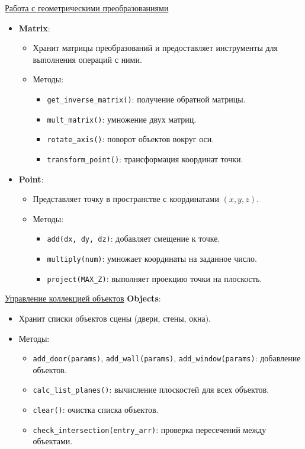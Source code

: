 \underline{Работа с геометрическими преобразованиями}
\begin{itemize}
    \item \textbf{Matrix}:
    \begin{itemize}
        \item Хранит матрицы преобразований и предоставляет инструменты для выполнения операций с ними.
        \item Методы:
        \begin{itemize}
            \item \verb|get_inverse_matrix()|: получение обратной матрицы.
            \item \verb|mult_matrix()|: умножение двух матриц.
            \item \verb|rotate_axis()|: поворот объектов вокруг оси.
            \item \verb|transform_point()|: трансформация координат точки.
        \end{itemize}
    \end{itemize}
    \item \textbf{Point}:
    \begin{itemize}
        \item Представляет точку в пространстве с координатами $(x, y, z)$.
        \item Методы:
        \begin{itemize}
            \item \verb|add(dx, dy, dz)|: добавляет смещение к точке.
            \item \verb|multiply(num)|: умножает координаты на заданное число.
            \item \verb|project(MAX_Z)|: выполняет проекцию точки на плоскость.
        \end{itemize}
    \end{itemize}
\end{itemize}

\underline{Управление коллекцией объектов}
\textbf{Objects}:
\begin{itemize}
    \item Хранит списки объектов сцены (двери, стены, окна).
    \item Методы:
    \begin{itemize}
        \item \verb|add_door(params)|, \verb|add_wall(params)|, \verb|add_window(params)|: добавление объектов.
        \item \verb|calc_list_planes()|: вычисление плоскостей для всех объектов.
        \item \verb|clear()|: очистка списка объектов.
        \item \verb|check_intersection(entry_arr)|: проверка пересечений между объектами.
    \end{itemize}
\end{itemize}

